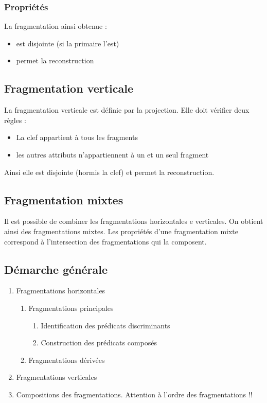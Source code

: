 \documentclass[10pt,a4paper,twoside]{article}
\begin{document}
\subsubsection{Propriétés}
La fragmentation ainsi obtenue :
\begin{itemize}
\item est disjointe (si la primaire l'est)
\item permet la reconstruction
\end{itemize}

\subsection{Fragmentation verticale}
La fragmentation verticale est définie par la projection. Elle doit vérifier deux règles :
\begin{itemize}
\item La clef appartient à tous les fragments
\item les autres attributs n'appartiennent à un et un seul fragment
\end{itemize}
Ainsi elle est disjointe (hormis la clef) et permet la reconstruction.

\subsection{Fragmentation mixtes}
Il est possible de combiner les fragmentations horizontales e verticales. On obtient ainsi des fragmentations mixtes. Les propriétés d'une fragmentation mixte correspond à l'intersection des fragmentations qui la composent.

\subsection{Démarche générale}
\begin{enumerate}
\item Fragmentations horizontales
\begin{enumerate}
\item Fragmentations principales
\begin{enumerate}
\item Identification des prédicats discriminants
\item Construction des prédicats composés
\end{enumerate}
\item Fragmentations dérivées
\end{enumerate}
\item Fragmentations verticales
\item Compositions des fragmentations. Attention à l'ordre des fragmentations !!
\end{enumerate}
\end{document}
